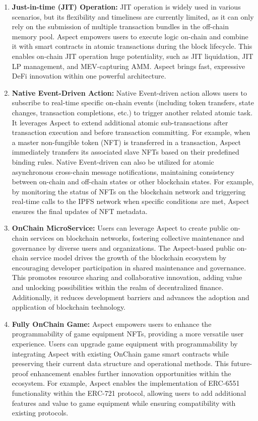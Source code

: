 \begin{enumerate}
  \item \textbf{Just-in-time (JIT) Operation:} JIT operation is widely used in various scenarios, but its flexibility and timeliness are currently limited, as it can only rely on the submission of multiple transaction bundles in the off-chain memory pool. Aspect empowers users to execute logic on-chain and combine it with smart contracts in atomic transactions during the block lifecycle. This enables on-chain JIT operation huge potentiality, such as JIT liquidation, JIT LP management, and MEV-capturing AMM. Aspect brings fast, expressive DeFi innovation within one powerful architecture.
  
  \item \textbf{Native Event-Driven Action:} Native Event-driven action allows users to subscribe to real-time specific on-chain events (including token transfers, state changes, transaction completions, etc.) to trigger another related atomic task. It leverages Aspect to extend additional atomic sub-transactions after transaction execution and before transaction committing. For example, when a master non-fungible token (NFT) is transferred in a transaction, Aspect immediately transfers its associated slave NFTs based on their predefined binding rules. Native Event-driven can also be utilized for atomic asynchronous cross-chain message notifications, maintaining consistency between on-chain and off-chain states or other blockchain states. For example, by monitoring the status of NFTs on the blockchain network and triggering real-time calls to the IPFS network when specific conditions are met, Aspect ensures the final updates of NFT metadata.
  
  \item \textbf{OnChain MicroService:} Users can leverage Aspect to create public on-chain services on blockchain networks, fostering collective maintenance and governance by diverse users and organizations. The Aspect-based public on-chain service model drives the growth of the blockchain ecosystem by encouraging developer participation in shared maintenance and governance. This promotes resource sharing and collaborative innovation, adding value and unlocking possibilities within the realm of decentralized finance. Additionally, it reduces development barriers and advances the adoption and application of blockchain technology.
  
  \item \textbf{Fully OnChain Game:} Aspect empowers users to enhance the programmability of game equipment NFTs, providing a more versatile user experience. Users can upgrade game equipment with programmability by integrating Aspect with existing OnChain game smart contracts while preserving their current data structure and operational methods. This future-proof enhancement enables further innovation opportunities within the ecosystem. For example, Aspect enables the implementation of ERC-6551 functionality within the ERC-721 protocol, allowing users to add additional features and value to game equipment while ensuring compatibility with existing protocols.
\end{enumerate}

